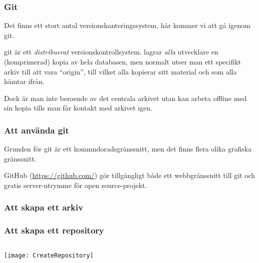 \documentclass[swedish]{beamer}
\newenvironment{dialogue}{%
\VerbatimEnvironment
\begin{Verbatim}[fontsize=\footnotesize,commandchars=\#\(\)]%
}
{%
\end{Verbatim}
}
\begin{document}
\begin{frame}
\frametitle{Git}
Det finns ett stort antal versionshanteringssystem, här kommer vi att gå igenom git.

  git är ett \emph{distribuerat} versionskontrollsystem.  \Mao lagrar \emph{alla} utvecklare en (komprimerad) kopia av hela databasen, men normalt utser man ett specifikt arkiv till att vara ``origin'', till vilket alla kopierar sitt material och som alla hämtar ifrån.

Dock är man inte beroende av det centrala arkivet utan kan arbeta offline med sin kopia tills man får kontakt med arkivet igen.

\end{frame}

\begin{frame}
  \frametitle{Att använda git}
Grunden för git är ett kommndoradsgränssnitt, men det finns flera olika grafiska gränssnitt.

GitHub (\url{https://github.com/}) gör tillgängligt både ett webbgränssnitt till git och gratis server-utrymme för open source-projekt.

\end{frame}


\begin{frame}
\frametitle{Att skapa ett arkiv}

\end{frame}

\begin{frame}[fragile]
\end{frame}


\begin{frame}[fragile]
\end{frame}

\begin{frame}[fragile]
\frametitle{Att skapa ett repository}  
\begin{columns}
\begin{column}{0.5\textwidth}

\vspace{\baselineskip}

\texttt{[image: CreateRepository]}
\end{column}
\end{columns}
\end{frame}
\end{document}
